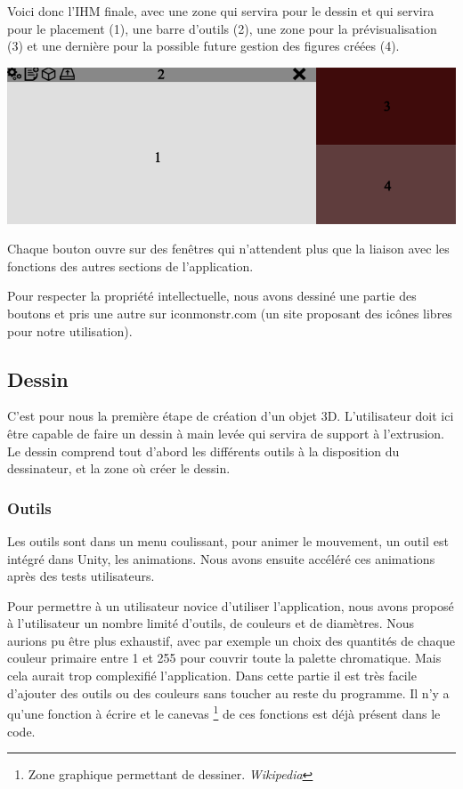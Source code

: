 \documentclass[a4paper,11pt]{article}
\begin{document}
			Voici donc l'IHM finale, avec une zone qui servira pour le dessin et qui servira pour le placement (1), une barre d'outils (2), une zone pour la prévisualisation (3) et une dernière pour la possible future gestion des figures créées (4).
			
			\centerline{\includegraphics[scale=0.5]{images/ihm.png}}

			Chaque bouton ouvre sur des fenêtres qui n'attendent plus que la liaison avec les fonctions des autres sections de l'application.
			
			Pour respecter la propriété intellectuelle, nous avons dessiné une partie des boutons et pris une autre sur iconmonstr.com\cite{iconmonstr} (un site proposant des icônes libres pour notre utilisation).
		\subsection{Dessin}
		
			C'est pour nous la première étape de création d'un objet 3D. L'utilisateur doit ici être capable de faire un dessin à main levée qui servira de support à l'extrusion. Le dessin comprend tout d'abord les différents outils à la disposition du dessinateur, et la zone où créer le dessin.
			
			\subsubsection{Outils}	%
						
				Les outils sont dans un menu coulissant, pour animer le mouvement, un outil est intégré dans Unity, les animations. Nous avons ensuite accéléré ces animations après des tests utilisateurs.
					
				Pour permettre à un utilisateur novice d'utiliser l'application, nous avons proposé à l'utilisateur un nombre limité d'outils, de couleurs et de diamètres. Nous aurions pu être plus exhaustif, avec par exemple un choix des quantités de chaque couleur primaire entre 1 et 255 pour couvrir toute la palette chromatique. Mais cela aurait trop complexifié l'application.
				Dans cette partie il est très facile d'ajouter des outils ou des couleurs sans toucher au reste du programme. Il n'y a qu'une fonction à écrire et le canevas \footnote{Zone graphique permettant de dessiner. \emph{Wikipedia}} de ces fonctions est déjà présent dans le code.
\end{document}
